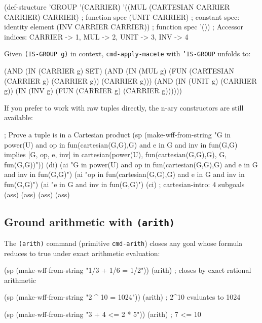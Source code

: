 \documentclass{amsbook}[openany]
\theoremstyle{definition}
\theoremstyle{remark}
\theoremstyle{remark}
\begin{document}
\begin{VNBcode}
(def-structure 'GROUP
  '(CARRIER)
  '((MUL  (CARTESIAN CARRIER CARRIER) CARRIER) ; function spec
    (UNIT CARRIER)                              ; constant spec: identity element
    (INV  CARRIER CARRIER))                     ; function spec
  '())
; Accessor indices: CARRIER -> 1, MUL -> 2, UNIT -> 3, INV -> 4
\end{VNBcode}

Given \texttt{(IS-GROUP g)} in context, \texttt{cmd-apply-macete} with
\texttt{'IS-GROUP} unfolds to:
\begin{VNBcode}
(AND (IN (CARRIER g) SET)
     (AND (IN (MUL g) (FUN (CARTESIAN (CARRIER g) (CARRIER g))
                            (CARRIER g)))
          (AND (IN (UNIT g) (CARRIER g))
               (IN (INV g) (FUN (CARRIER g) (CARRIER g))))))
\end{VNBcode}

If you prefer to work with raw tuples directly, the n-ary constructors
are still available:
\begin{VNBcode}
; Prove a tuple is in a Cartesian product
(sp (make-wff-from-string
  "G in power(U) and op in fun(cartesian(G,G),G) and e in G and inv in fun(G,G)
   implies [G, op, e, inv] in cartesian(power(U), fun(cartesian(G,G),G), G, fun(G,G))"))
(di)
(ai "G in power(U) and op in fun(cartesian(G,G),G) and e in G and inv in fun(G,G)")
(ai "op in fun(cartesian(G,G),G) and e in G and inv in fun(G,G)")
(ai "e in G and inv in fun(G,G)")
(ci)                              ; cartesian-intro: 4 subgoals
(ass) (ass) (ass) (ass)
\end{VNBcode}

\subsection{Ground arithmetic with \texttt{(arith)}}

The \texttt{(arith)} command (primitive \texttt{cmd-arith}) closes any
goal whose formula reduces to true under exact arithmetic evaluation:

\begin{VNBcode}
(sp (make-wff-from-string "1/3 + 1/6 = 1/2"))
(arith)                              ; closes by exact rational arithmetic

(sp (make-wff-from-string "2 ^ 10 = 1024"))
(arith)                              ; 2^10 evaluates to 1024

(sp (make-wff-from-string "3 + 4 <= 2 * 5"))
(arith)                              ; 7 <= 10
\end{VNBcode}
\end{document}
